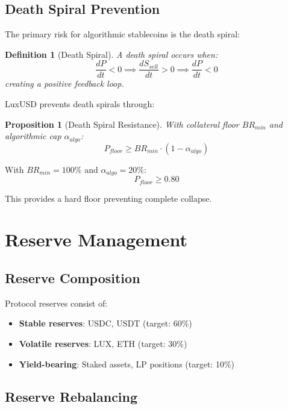 \documentclass[11pt,a4paper]{article}
\newtheorem{proposition}[theorem]{Proposition}
\newtheorem{definition}[theorem]{Definition}
\begin{document}
\subsection{Death Spiral Prevention}

The primary risk for algorithmic stablecoins is the death spiral:

\begin{definition}[Death Spiral]
A death spiral occurs when:
\begin{equation}
    \frac{dP}{dt} < 0 \implies \frac{dS_{sell}}{dt} > 0 \implies \frac{dP}{dt} < 0
\end{equation}
creating a positive feedback loop.
\end{definition}

LuxUSD prevents death spirals through:

\begin{proposition}[Death Spiral Resistance]
With collateral floor $BR_{min}$ and algorithmic cap $\alpha_{algo}$:
\begin{equation}
    P_{floor} \geq BR_{min} \cdot (1 - \alpha_{algo})
\end{equation}
\end{proposition}

With $BR_{min} = 100\%$ and $\alpha_{algo} = 20\%$:
\begin{equation}
    P_{floor} \geq 0.80
\end{equation}

This provides a hard floor preventing complete collapse.

\section{Reserve Management}

\subsection{Reserve Composition}

Protocol reserves consist of:
\begin{itemize}
    \item \textbf{Stable reserves}: USDC, USDT (target: 60\%)
    \item \textbf{Volatile reserves}: LUX, ETH (target: 30\%)
    \item \textbf{Yield-bearing}: Staked assets, LP positions (target: 10\%)
\end{itemize}

\subsection{Reserve Rebalancing}
\end{document}
